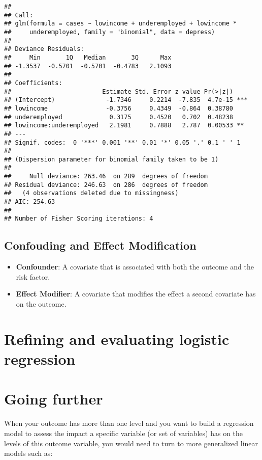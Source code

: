 \documentclass[]{article}
\begin{document}
\begin{verbatim}
## 
## Call:
## glm(formula = cases ~ lowincome + underemployed + lowincome * 
##     underemployed, family = "binomial", data = depress)
## 
## Deviance Residuals: 
##     Min       1Q   Median       3Q      Max  
## -1.3537  -0.5701  -0.5701  -0.4783   2.1093  
## 
## Coefficients:
##                         Estimate Std. Error z value Pr(>|z|)    
## (Intercept)              -1.7346     0.2214  -7.835  4.7e-15 ***
## lowincome                -0.3756     0.4349  -0.864  0.38780    
## underemployed             0.3175     0.4520   0.702  0.48238    
## lowincome:underemployed   2.1981     0.7888   2.787  0.00533 ** 
## ---
## Signif. codes:  0 '***' 0.001 '**' 0.01 '*' 0.05 '.' 0.1 ' ' 1
## 
## (Dispersion parameter for binomial family taken to be 1)
## 
##     Null deviance: 263.46  on 289  degrees of freedom
## Residual deviance: 246.63  on 286  degrees of freedom
##   (4 observations deleted due to missingness)
## AIC: 254.63
## 
## Number of Fisher Scoring iterations: 4
\end{verbatim}

\subsection{Confouding and Effect
Modification}\label{confouding-and-effect-modification}

\begin{itemize}
\itemsep1pt\parskip0pt
\item
  \textbf{Confounder}: A covariate that is associated with both the
  outcome and the risk factor.
\item
  \textbf{Effect Modifier}: A covariate that modifies the effect a
  second covariate has on the outcome.
\end{itemize}

\section{Refining and evaluating logistic
regression}\label{refining-and-evaluating-logistic-regression}

\section{Going further}\label{going-further}

When your outcome has more than one level and you want to build a
regression model to assess the impact a specific variable (or set of
variables) has on the levels of this outcome variable, you would need to
turn to more generalized linear models such as:
\end{document}
